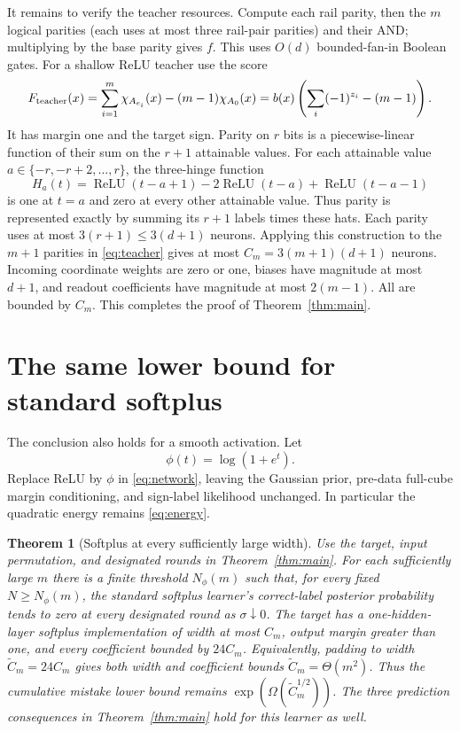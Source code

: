 \documentclass[11pt]{article}
\newtheorem{theorem}{Theorem}
\theoremstyle{remark}\newtheorem{remark}[theorem]{Remark}
\newcommand{\relu}{\operatorname{ReLU}}\newcommand{\Var}{\operatorname{Var}}
\begin{document}
It remains to verify the teacher resources. Compute each rail parity,
then the $m$ logical parities (each uses at most three rail-pair parities)
and their AND; multiplying by the base
parity gives $f$. This uses $O(d)$ bounded-fan-in Boolean gates. For a
shallow ReLU teacher use the score
\begin{equation}\label{eq:teacher}
 F_{\rm teacher}(x)=\sum_{i=1}^m\chi_{A_{e_i}}(x)
                   -(m-1)\chi_{A_0}(x)
 =b(x)\left(\sum_i(-1)^{z_i}-(m-1)\right).
\end{equation}
It has margin one and the target sign. Parity on $r$ bits is a
piecewise-linear function of their sum on the $r+1$ attainable values.
For each attainable value $a\in\{-r,-r+2,\ldots,r\}$, the
three-hinge function
\[
 H_a(t)=\relu(t-a+1)-2\relu(t-a)+\relu(t-a-1)
\]
is one at $t=a$ and zero at every other attainable value. Thus parity
is represented exactly by summing its $r+1$ labels times these hats.
Each parity uses at most $3(r+1)\le3(d+1)$ neurons. Applying this
construction to the $m+1$ parities in \eqref{eq:teacher} gives at most
$C_m=3(m+1)(d+1)$ neurons. Incoming coordinate weights are zero or
one, biases have magnitude at most $d+1$, and readout coefficients
have magnitude at most $2(m-1)$. All are bounded by $C_m$.
This completes
the proof of Theorem~\ref{thm:main}.

\section{The same lower bound for standard softplus}
\label{sec:softplus}

The conclusion also holds for a smooth activation. Let
\[
 \phi(t)=\log(1+e^t).
\]
Replace ReLU by $\phi$ in \eqref{eq:network}, leaving the Gaussian prior,
pre-data full-cube margin conditioning, and sign-label likelihood
unchanged. In particular the quadratic energy remains \eqref{eq:energy}.

\begin{theorem}[Softplus at every sufficiently large width]
\label{thm:softplus}
Use the target, input permutation, and designated rounds in
Theorem~\ref{thm:main}. For each sufficiently large $m$ there is a finite threshold
$N_\phi(m)$ such that, for every fixed $N\ge N_\phi(m)$, the standard
softplus learner's correct-label posterior probability tends to zero at
every designated round as $\sigma\downarrow0$.
The target has a one-hidden-layer softplus implementation of width at
most $C_m$, output margin greater than one, and every coefficient bounded
by $24C_m$. Equivalently, padding to width $\widetilde C_m=24C_m$ gives
both width and coefficient bounds $\widetilde C_m=\Theta(m^2)$.
Thus the cumulative mistake lower bound remains
$\exp(\Omega(\widetilde C_m^{1/2}))$.
The three prediction consequences in Theorem~\ref{thm:main} hold for
this learner as well.
\end{theorem}
\end{document}
